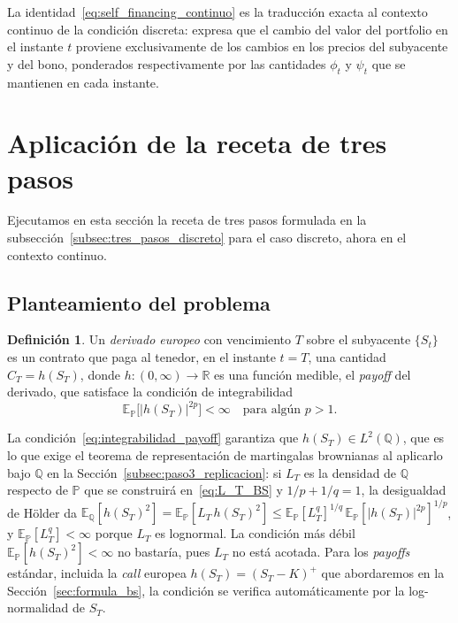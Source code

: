 \documentclass[11pt,a4paper,oneside]{report}
\theoremstyle{plain}
\theoremstyle{definition}
\newtheorem{definicion}[teorema]{Definición}
\theoremstyle{remark}
\newcommand{\R}{\mathbb{R}}
\newcommand{\E}{\mathbb{E}}
\newcommand{\PP}{\mathbb{P}}
\newcommand{\Q}{\mathbb{Q}}
\newcommand{\1}{\mathbf{1}}
\begin{document}
La identidad~\eqref{eq:self_financing_continuo} es la traducción
exacta al contexto continuo de la condición discreta:
expresa que el cambio del valor del portfolio en el instante $t$
proviene exclusivamente de los cambios en los precios del subyacente
y del bono, ponderados respectivamente por las cantidades $\phi_t$ y
$\psi_t$ que se mantienen en cada instante.

\section{Aplicación de la receta de tres pasos}
\label{sec:tres_pasos_continuo}

Ejecutamos en esta sección la receta de tres pasos formulada en la
subsección~\ref{subsec:tres_pasos_discreto} para el caso discreto,
ahora en el contexto continuo.

\subsection{Planteamiento del problema}
\label{subsec:planteamiento_continuo}

\begin{definicion}
\label{def:derivado_europeo}
Un \emph{derivado europeo} con vencimiento $T$ sobre el subyacente
$\{S_t\}$ es un contrato que paga al tenedor, en el instante $t = T$,
una cantidad $C_T = h(S_T)$, donde $h : (0, \infty) \to \R$ es una
función medible, el \emph{payoff} del derivado, que satisface la
condición de integrabilidad
\begin{equation}\label{eq:integrabilidad_payoff}
  \E_\PP\bigl[|h(S_T)|^{2p}\bigr] < \infty \quad \text{para algún } p > 1.
\end{equation}
\end{definicion}

La condición~\eqref{eq:integrabilidad_payoff} garantiza que $h(S_T) \in L^2(\Q)$, que es lo que exige el teorema de representación de martingalas brownianas al aplicarlo bajo $\Q$ en la Sección~\ref{subsec:paso3_replicacion}: si $L_T$ es la densidad de $\Q$ respecto de $\PP$ que se construirá en~\eqref{eq:L_T_BS} y $1/p + 1/q = 1$, la desigualdad de Hölder da $\E_\Q[h(S_T)^2] = \E_\PP[L_T\, h(S_T)^2] \le \E_\PP[L_T^q]^{1/q}\, \E_\PP[|h(S_T)|^{2p}]^{1/p}$, y $\E_\PP[L_T^q] < \infty$ porque $L_T$ es lognormal. La condición más débil $\E_\PP[h(S_T)^2] < \infty$ no bastaría, pues $L_T$ no está acotada. Para los \emph{payoffs} estándar, incluida la \emph{call} europea $h(S_T) = (S_T - K)^+$ que abordaremos en la Sección~\ref{sec:formula_bs}, la condición se verifica automáticamente por la log-normalidad de $S_T$.
\end{document}
